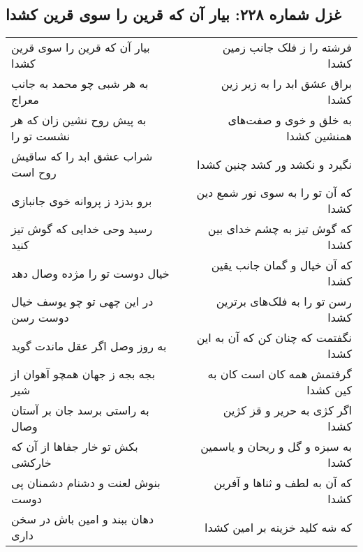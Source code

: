\begin{center}
\section*{غزل شماره ۲۲۸: بیار آن که قرین را سوی قرین کشدا}
\label{sec:0228}
\begin{longtable}{l p{0.5cm} r}
بیار آن که قرین را سوی قرین کشدا
&&
فرشته را ز فلک جانب زمین کشدا
\\
به هر شبی چو محمد به جانب معراج
&&
براق عشق ابد را به زیر زین کشدا
\\
به پیش روح نشین زان که هر نشست تو را
&&
به خلق و خوی و صفت‌های همنشین کشدا
\\
شراب عشق ابد را که ساقیش روح است
&&
نگیرد و نکشد ور کشد چنین کشدا
\\
برو بدزد ز پروانه خوی جانبازی
&&
که آن تو را به سوی نور شمع دین کشدا
\\
رسید وحی خدایی که گوش تیز کنید
&&
که گوش تیز به چشم خدای بین کشدا
\\
خیال دوست تو را مژده وصال دهد
&&
که آن خیال و گمان جانب یقین کشدا
\\
در این چهی تو چو یوسف خیال دوست رسن
&&
رسن تو را به فلک‌های برترین کشدا
\\
به روز وصل اگر عقل ماندت گوید
&&
نگفتمت که چنان کن که آن به این کشدا
\\
بجه بجه ز جهان همچو آهوان از شیر
&&
گرفتمش همه کان است کان به کین کشدا
\\
به راستی برسد جان بر آستان وصال
&&
اگر کژی به حریر و قز کژین کشدا
\\
بکش تو خار جفاها از آن که خارکشی
&&
به سبزه و گل و ریحان و یاسمین کشدا
\\
بنوش لعنت و دشنام دشمنان پی دوست
&&
که آن به لطف و ثناها و آفرین کشدا
\\
دهان ببند و امین باش در سخن داری
&&
که شه کلید خزینه بر امین کشدا
\\
\end{longtable}
\end{center}
